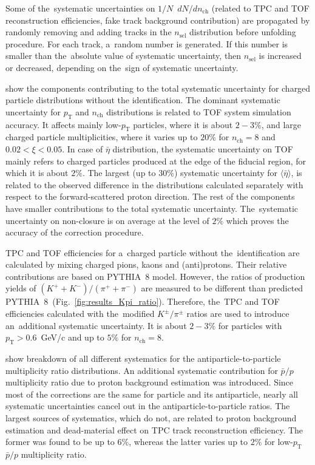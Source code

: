 Some of the~systematic uncertainties on $1/N$~$dN/dn_\textrm{ch}$ (related to TPC and TOF reconstruction efficiencies, fake track background contribution)  are propagated by randomly removing and adding tracks in the $n_\textrm{sel}$ distribution before  unfolding procedure. For each track, a~random number is generated. If this number is smaller than the~absolute value of systematic uncertainty, then $n_\textrm{sel}$ is increased or decreased, depending on the~sign of systematic uncertainty.



 show the components contributing to the total systematic uncertainty for charged particle distributions without the identification. The dominant systematic uncertainty for $p_\textrm{T}$ and $n_\textrm{ch}$ distributions is related to TOF system simulation accuracy. It affects mainly low-$p_\textrm{T}$ particles, where it is about $2-3\%$, and large charged particle multiplicities, where it varies up to $20\%$ for $n_\textrm{ch}=8$ and $0.02 < \xi < 0.05$. In case of $\bar{\eta}$ distribution, the systematic uncertainty on TOF mainly refers to charged particles produced at the edge of the fiducial region, for which it is about $2\%$.  The largest (up to $30\%$) systematic uncertainty for $\langle\bar{\eta}\rangle$,  is related to the observed difference  in the distributions calculated separately with respect to the forward-scattered proton direction. The rest of the components have smaller contributions to the total systematic uncertainty. The~systematic uncertainty on non-closure is on average at the level of $2\%$ which proves  the accuracy of the correction procedure. 

TPC and TOF efficiencies for a~charged particle without the~identification are calculated by mixing charged pions, kaons and (anti)protons. Their relative contributions are based on PYTHIA~8 model. However, the ratios of production yields of $\left(K^{+}+K^{-}\right)/\left(\pi^{+}+\pi^{-}\right)$ are measured to be different than predicted PYTHIA~8~(Fig.~\ref{fig:results_Kpi_ratio}). Therefore, 
the~TPC and TOF efficiencies calculated with the~modified $K^{\pm}/\pi^{\pm}$ ratios are used to introduce  an~additional systematic uncertainty. It is about $2-3\%$ for particles with $p_\textrm{T}>0.6$~GeV/c and up to $5\%$ for $n_\textrm{ch}=8$.


 show breakdown of all different systematics for the antiparticle-to-particle multiplicity ratio distributions. An additional systematic contribution for $\bar{p}/p$ multiplicity ratio due to proton background estimation was introduced.
Since most of the corrections are the same for particle and its antiparticle, nearly all systematic uncertainties cancel out in the antiparticle-to-particle ratios. 
The largest sources of systematics, which  do not, are related to proton background estimation and dead-material effect on TPC track reconstruction efficiency.  The former was found to be up to $6\%$, whereas the latter varies up to $2\%$ for low-$p_\textrm{T}$ $\bar{p}/p$ multiplicity ratio. 



